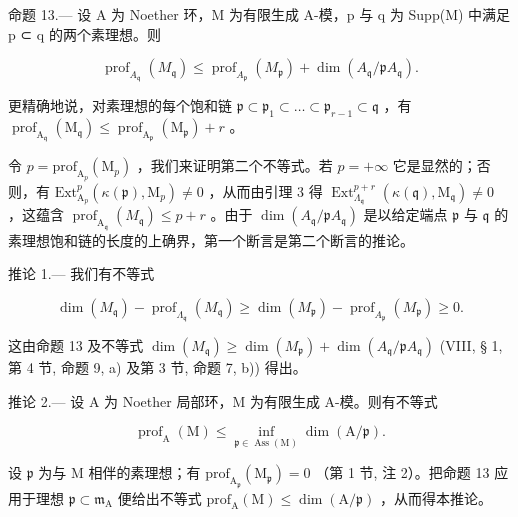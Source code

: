 命题 13.--- 设 A 为 Noether 环，M 为有限生成 A-模，p 与 q 为 Supp(M) 中满足 p ⊂ q 的两个素理想。则

\[
\operatorname{prof} _ {A _ {\mathfrak {q}}} (M _ {\mathfrak {q}}) \leqslant \operatorname{prof} _ {A _ {\mathfrak {p}}} (M _ {\mathfrak {p}}) + \dim (A _ {\mathfrak {q}} / \mathfrak {p} A _ {\mathfrak {q}}).
\]

更精确地说，对素理想的每个饱和链 \(\mathfrak{p} \subset \mathfrak{p}_1 \subset \ldots \subset \mathfrak{p}_{r-1} \subset \mathfrak{q}\) ，有 \(\operatorname{prof}_{\mathrm{A}_{\mathfrak{q}}}(\mathrm{M}_{\mathfrak{q}}) \leqslant \operatorname{prof}_{\mathrm{A}_{\mathfrak{p}}}(\mathrm{M}_{\mathfrak{p}}) + r\) 。

令 \(p = \text{prof}_{\text{A}_p}(\text{M}_p)\) ，我们来证明第二个不等式。若 \(p = +\infty\) 它是显然的；否则，有 \(\text{Ext}_{\text{A}_p}^p(\kappa(\mathfrak{p}), \text{M}_p) \neq 0\) ，从而由引理 3 得 \(\operatorname{Ext}_{\Lambda_{\mathfrak{q}}}^{p+r}(\kappa(\mathfrak{q}),\mathrm{M}_{\mathfrak{q}})\neq0\) ，这蕴含 \(\operatorname{prof}_{\mathrm{A}_{\mathfrak{q}}}(M_{\mathfrak{q}})\leqslant p+r\) 。由于 \(\dim(A_{\mathfrak{q}}/\mathfrak{p}A_{\mathfrak{q}})\) 是以给定端点 \(\mathfrak{p}\) 与 \(\mathfrak{q}\) 的素理想饱和链的长度的上确界，第一个断言是第二个断言的推论。

推论 1.--- 我们有不等式

\[
\dim (M _ {\mathfrak {q}}) - \operatorname{prof} _ {\Lambda_ {\mathfrak {q}}} (M _ {\mathfrak {q}}) \geqslant \dim (M _ {\mathfrak {p}}) - \operatorname{prof} _ {A _ {\mathfrak {p}}} (M _ {\mathfrak {p}}) \geqslant 0.
\]

这由命题 13 及不等式 \(\dim(M_{\mathfrak{q}}) \geqslant \dim(M_{\mathfrak{p}}) + \dim(A_{\mathfrak{q}} / \mathfrak{p}A_{\mathfrak{q}})\) (VIII, § 1, 第 4 节, 命题 9, a) 及第 3 节, 命题 7, b)) 得出。

推论 2.--- 设 A 为 Noether 局部环，M 为有限生成 A-模。则有不等式

\[
\operatorname{prof} _ {\mathrm{A}} (\mathrm{M}) \leqslant \inf _ {\mathfrak {p} \in \operatorname{Ass} (\mathrm{M})} \dim (\mathrm{A} / \mathfrak {p}).
\]

设 \(\mathfrak{p}\) 为与 M 相伴的素理想；有 \(\mathrm{prof}_{\mathrm{A}_{\mathfrak{p}}}(\mathrm{M}_{\mathfrak{p}})=0\) （第 1 节, 注 2）。把命题 13 应用于理想 \(\mathfrak{p}\subset\mathfrak{m}_{\mathrm{A}}\) 便给出不等式 \(\mathrm{prof}_{\mathrm{A}}(\mathrm{M})\leqslant\dim(\mathrm{A}/\mathfrak{p})\) ，从而得本推论。


